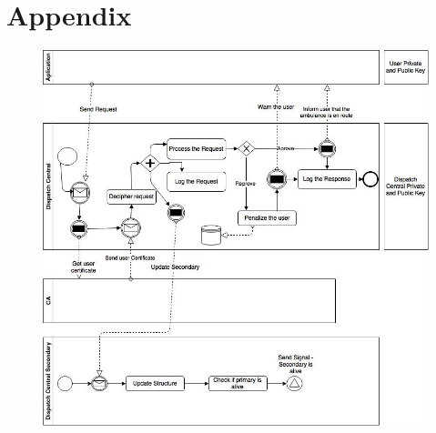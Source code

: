 \documentclass[a4paper,titlepage,11pt]{article}
\begin{document}
\newpage

\section{Appendix}
\begin{figure}[h]
    \centering
    \includegraphics[scale=0.50]{img/advanced-solution.png}
\end{figure}
\end{document}
